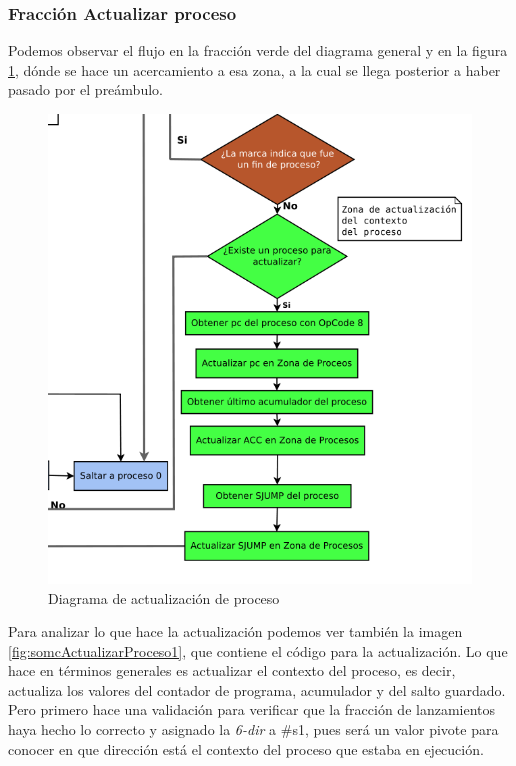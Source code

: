 \documentclass[letterpaper,12pt,oneside]{book}
\begin{document}
        \subsubsection{Fracción Actualizar proceso}
  
        Podemos observar
		el flujo en la fracción verde del diagrama general y en la figura \ref{fig:diagActualProccess1}, dónde se hace un acercamiento a esa zona,
		a la cual se llega posterior a haber pasado por el preámbulo.
		
		\begin{figure}[ht]		
			\centering
			\includegraphics[scale=0.6]{media/CARDIACC/DiagActualizacionProcess.png}
			\caption{ Diagrama de actualización de proceso}
			\label{fig:diagActualProccess1}
		\end{figure}		
		
		Para analizar lo que hace la actualización podemos ver también la imagen  \ref{fig:somcActualizarProceso1},	que contiene el código para la actualización. Lo
		que hace en términos generales es actualizar el contexto del proceso, es decir, actualiza los valores del contador de programa, acumulador y del
		salto guardado. Pero primero hace una validación para verificar que la fracción de lanzamientos haya hecho lo correcto y asignado la \textit{6-dir} a \#s1, pues
		será un valor pivote para conocer en que dirección está el contexto del proceso que estaba en ejecución.
  
\end{document}
